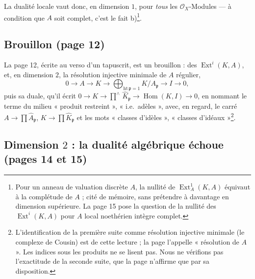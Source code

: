 \documentclass[11pt,a4paper]{article}
\begin{document}
La dualité locale vaut donc, en dimension $1$, pour \emph{tous} les
$\mathcal{O}_X$-Modules --- à condition que $A$ soit complet, c'est le fait
b)\footnote{Pour un anneau de valuation discrète $A$, la nullité de
$\operatorname{Ext}^1_A(K, A)$ équivaut à la complétude de $A$ ; cité de
mémoire, sans prétendre à davantage en dimension supérieure. La page
15 pose la question de la nullité des $\operatorname{Ext}^i(K, A)$ pour $A$
local noethérien intègre complet.}.

\subsection*{Brouillon (page 12)}

La page 12, écrite au verso d'un tapuscrit, est un brouillon : des
$\operatorname{Ext}^i(K, A)$, et, en dimension $2$, la résolution injective
minimale de $A$ régulier,
\[
  0 \to A \to K \to \bigoplus_{\mathrm{ht}\,\mathfrak{p} = 1} K/A_{\mathfrak{p}}
  \to I \to 0,
\]
puis sa duale, qu'il écrit $0 \to K \to {\prod}^{\wedge}\, \widehat{K}_{\mathfrak{p}}
\to \operatorname{Hom}(K, I) \to 0$, en nommant le terme du milieu « produit
restreint », « i.e.\ adèles », avec, en regard, le carré
$A \to \prod \widehat{A}_{\mathfrak{p}}$, $K \to \prod
\widehat{K}_{\mathfrak{p}}$ et les mots « classes d'idèles », « classes
d'idéaux »\footnote{L'identification de la première suite comme résolution
injective minimale (le complexe de Cousin) est de cette lecture ; la page
l'appelle « résolution de $A$ ». Les indices sous les produits ne se lisent
pas. Nous ne vérifions pas l'exactitude de la seconde suite, que la page
n'affirme que par sa disposition.}.

\subsection*{Dimension $2$ : la dualité algébrique échoue (pages 14 et 15)}
\end{document}
